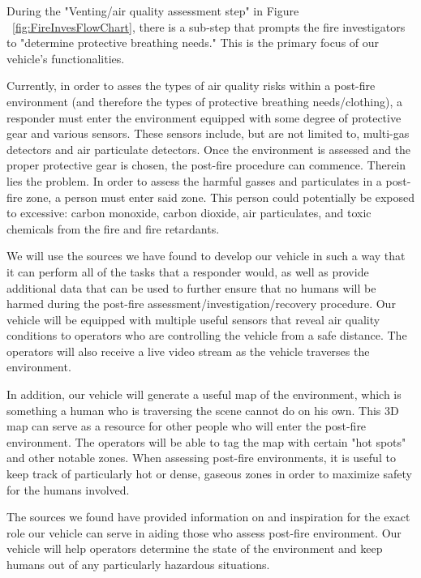 During the "Venting/air quality assessment step" in Figure ~\ref{fig:FireInvesFlowChart}, there is a sub-step that prompts the fire investigators to "determine protective breathing needs."\cite{nfpa} This is the primary focus of our vehicle's functionalities.

Currently, in order to asses the types of air quality risks within a post-fire environment (and therefore the types of protective breathing needs/clothing), a responder must enter the environment equipped with some degree of protective gear and various sensors. These sensors include, but are not limited to, multi-gas detectors and air particulate detectors.\cite{evaluationofhazards} Once the environment is assessed and the proper protective gear is chosen, the post-fire procedure can commence. Therein lies the problem. In order to assess the harmful gasses and particulates in a post-fire zone, a person must enter said zone. This person could potentially be exposed to excessive: carbon monoxide, carbon dioxide, air particulates, and toxic chemicals from the fire and fire retardants. \cite{toxichazards}


We will use the sources we have found to develop our vehicle in such a way that it can perform all of the tasks that a responder would, as well as provide additional data that can be used to further ensure that no humans will be harmed during the post-fire assessment/investigation/recovery procedure. 
Our vehicle will be equipped with multiple useful sensors that reveal air quality conditions to operators who are controlling the vehicle from a safe distance. The operators will also receive a live video stream as the vehicle traverses the environment. 

In addition, our vehicle will generate a useful map of the environment, which is something a human who is traversing the scene cannot do on his own. This 3D map can serve as a resource for other people who will enter the post-fire environment. The operators will be able to tag the map with certain "hot spots" and other notable zones. When assessing post-fire environments, it is useful to keep track of particularly hot or dense, gaseous zones in order to maximize safety for the humans involved. \cite{recoveringfromwildfire}

The sources we found have provided information on and inspiration for the exact role our vehicle can serve in aiding those who assess post-fire environment. Our vehicle will help operators determine the state of the environment and keep humans out of any particularly hazardous situations. 








